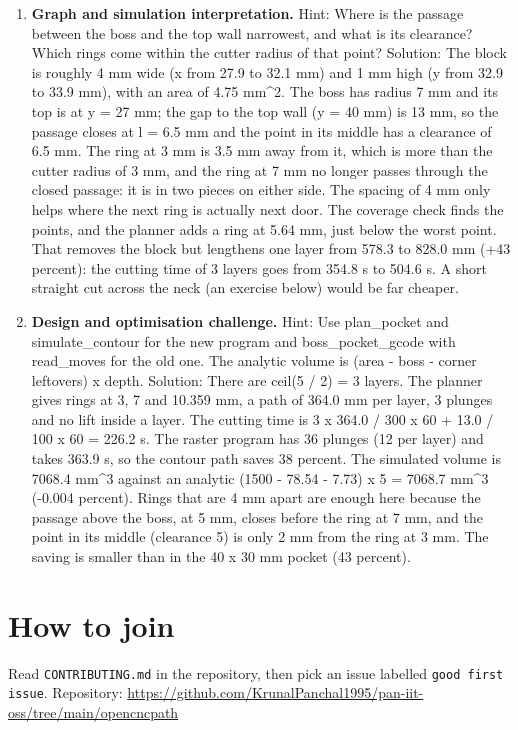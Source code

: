 \documentclass[11pt,a4paper]{article}
\begin{document}
\begin{enumerate}[nosep]
\item \textbf{Graph and simulation interpretation.} Hint: Where is the passage between the boss and the top wall narrowest, and what is its clearance? Which rings come within the cutter radius of that point? Solution: The block is roughly 4 mm wide (x from 27.9 to 32.1 mm) and 1 mm high (y from 32.9 to 33.9 mm), with an area of 4.75 mm\textasciicircum{}2. The boss has radius 7 mm and its top is at y = 27 mm; the gap to the top wall (y = 40 mm) is 13 mm, so the passage closes at l = 6.5 mm and the point in its middle has a clearance of 6.5 mm. The ring at 3 mm is 3.5 mm away from it, which is more than the cutter radius of 3 mm, and the ring at 7 mm no longer passes through the closed passage: it is in two pieces on either side. The spacing of 4 mm only helps where the next ring is actually next door. The coverage check finds the points, and the planner adds a ring at 5.64 mm, just below the worst point. That removes the block but lengthens one layer from 578.3 to 828.0 mm (+43 percent): the cutting time of 3 layers goes from 354.8 s to 504.6 s. A short straight cut across the neck (an exercise below) would be far cheaper.
\item \textbf{Design and optimisation challenge.} Hint: Use plan\_pocket and simulate\_contour for the new program and boss\_pocket\_gcode with read\_moves for the old one. The analytic volume is (area - boss - corner leftovers) x depth. Solution: There are ceil(5 / 2) = 3 layers. The planner gives rings at 3, 7 and 10.359 mm, a path of 364.0 mm per layer, 3 plunges and no lift inside a layer. The cutting time is 3 x 364.0 / 300 x 60 + 13.0 / 100 x 60 = 226.2 s. The raster program has 36 plunges (12 per layer) and takes 363.9 s, so the contour path saves 38 percent. The simulated volume is 7068.4 mm\textasciicircum{}3 against an analytic (1500 - 78.54 - 7.73) x 5 = 7068.7 mm\textasciicircum{}3 (-0.004 percent). Rings that are 4 mm apart are enough here because the passage above the boss, at 5 mm, closes before the ring at 7 mm, and the point in its middle (clearance 5) is only 2 mm from the ring at 3 mm. The saving is smaller than in the 40 x 30 mm pocket (43 percent).
\end{enumerate}

\section{How to join}
Read \texttt{CONTRIBUTING.md} in the repository, then pick an issue labelled \texttt{good first issue}. Repository: \url{https://github.com/KrunalPanchal1995/pan-iit-oss/tree/main/opencncpath}
\end{document}
